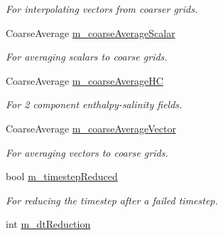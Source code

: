 \begin{DoxyCompactItemize}
\begin{DoxyCompactList}\small\item\em For interpolating vectors from coarser grids. \end{DoxyCompactList}\item 
\hypertarget{class_a_m_r_level_mushy_layer_af0e2d84fa6c2cf813bf25f1bb4c880ab}{Coarse\-Average \hyperlink{class_a_m_r_level_mushy_layer_af0e2d84fa6c2cf813bf25f1bb4c880ab}{m\-\_\-coarse\-Average\-Scalar}}\label{class_a_m_r_level_mushy_layer_af0e2d84fa6c2cf813bf25f1bb4c880ab}

\begin{DoxyCompactList}\small\item\em For averaging scalars to coarse grids. \end{DoxyCompactList}\item 
\hypertarget{class_a_m_r_level_mushy_layer_a22ba6f41aa7c557ac01cf6cb9e5fc8c9}{Coarse\-Average \hyperlink{class_a_m_r_level_mushy_layer_a22ba6f41aa7c557ac01cf6cb9e5fc8c9}{m\-\_\-coarse\-Average\-H\-C}}\label{class_a_m_r_level_mushy_layer_a22ba6f41aa7c557ac01cf6cb9e5fc8c9}

\begin{DoxyCompactList}\small\item\em For 2 component enthalpy-\/salinity fields. \end{DoxyCompactList}\item 
\hypertarget{class_a_m_r_level_mushy_layer_a992715b841cd44d7dbb64cd99acb9306}{Coarse\-Average \hyperlink{class_a_m_r_level_mushy_layer_a992715b841cd44d7dbb64cd99acb9306}{m\-\_\-coarse\-Average\-Vector}}\label{class_a_m_r_level_mushy_layer_a992715b841cd44d7dbb64cd99acb9306}

\begin{DoxyCompactList}\small\item\em For averaging vectors to coarse grids. \end{DoxyCompactList}\item 
\hypertarget{class_a_m_r_level_mushy_layer_aaaff66ec4a08d3d90fdee05a2a67cede}{bool \hyperlink{class_a_m_r_level_mushy_layer_aaaff66ec4a08d3d90fdee05a2a67cede}{m\-\_\-timestep\-Reduced}}\label{class_a_m_r_level_mushy_layer_aaaff66ec4a08d3d90fdee05a2a67cede}

\begin{DoxyCompactList}\small\item\em For reducing the timestep after a failed timestep. \end{DoxyCompactList}\item 
\hypertarget{class_a_m_r_level_mushy_layer_a514c73fd99d14fb7e4ce39b50636f6ce}{int \hyperlink{class_a_m_r_level_mushy_layer_a514c73fd99d14fb7e4ce39b50636f6ce}{m\-\_\-dt\-Reduction}}\label{class_a_m_r_level_mushy_layer_a514c73fd99d14fb7e4ce39b50636f6ce}


\end{DoxyCompactItemize}
